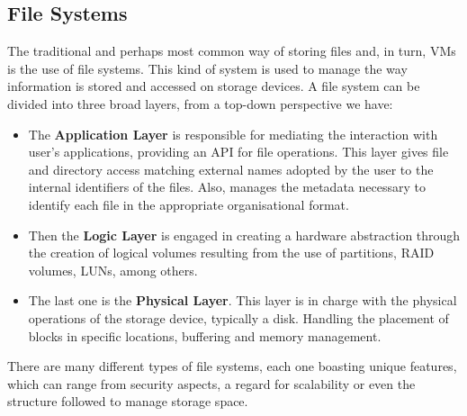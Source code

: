 \subsection{File Systems} %
\label{sub:res_file_systems}

The traditional and perhaps most common way of storing files and, in turn, VMs is the use of file systems.
This kind of system is used to manage the way information is stored and accessed on storage devices. A file system can be divided into three broad layers, from a top-down perspective we have:

\begin{itemize}
	\item The \textbf{Application Layer} is responsible for mediating the interaction with user's applications, providing an API for file operations. This layer gives file and directory access matching external names adopted by the user to the internal identifiers of the files. Also, manages the metadata necessary to identify each file in the appropriate organisational format.
	\item Then the \textbf{Logic Layer} is engaged in creating a hardware abstraction through the creation of logical volumes resulting from the use of partitions, RAID volumes, LUNs, among others.
	\item The last one is the \textbf{Physical Layer}. This layer is in charge with the physical operations of the storage device, typically a disk. Handling the placement of blocks in specific locations, buffering and memory management.
\end{itemize}


There are many different types of file systems, each one boasting unique features, which can range from security aspects, a regard for scalability or even the structure followed to manage storage space.

